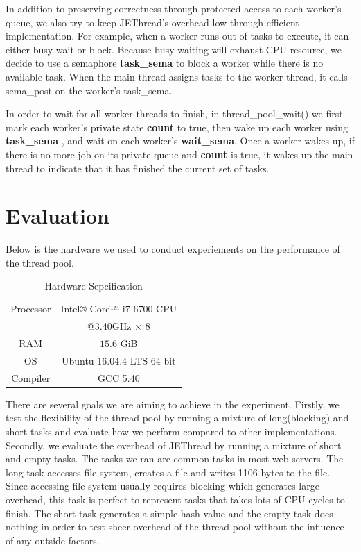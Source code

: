 \documentclass[journal, a4paper]{IEEEtran}
\begin{document}
In addition to preserving correctness through protected access to each worker's queue, we also try to keep JEThread's overhead low through efficient implementation. For example, when a worker runs out of tasks to execute, it can either busy wait or block. Because busy waiting will exhaust CPU resource, we decide to use a semaphore \textbf{task\_sema} to block a worker while there is no available task. When the main thread assigns tasks to the worker thread, it calls sema\_post on the worker's task\_sema. 

In order to wait for all worker threads to finish, in thread\_pool\_wait() we first mark each worker's private state \textbf{count} to true, then wake up each worker using \textbf{task\_sema} , and wait on each worker's \textbf{wait\_sema}. Once a worker wakes up, if there is no more job on its private queue and \textbf{count} is true, it wakes up the main thread to indicate that it has finished the current set of tasks. 

\section{Evaluation}
Below is the hardware we used to conduct experiements on the performance of the thread pool.
	\begin{table}[!hbt]
	\begin{center}
		\caption{Hardware Sepcification}
		\label{tab:simParameters}
		\begin{tabular}{|c|c|}
			\hline
			Processor & Intel® Core™ i7-6700 CPU \\
								&@3.40GHz $\times$ 8\\
			\hline
			RAM & $15.6$ GiB \\
			\hline
			OS & Ubuntu 16.04.4 LTS 64-bit\\
			\hline
			Compiler & GCC 5.40\\
			\hline
		\end{tabular}
		\end{center}
	\end{table}
	
There are several goals we are aiming to achieve in the experiment. Firstly, we test the flexibility of the thread pool by running a mixture of long(blocking) and short tasks and evaluate how we perform compared to other implementations. Secondly, we evaluate the overhead of JEThread by running a mixture of short and empty tasks. The tasks we ran are common tasks in most web servers. The long task accesses file system, creates a file and writes 1106 bytes to the file. Since accessing file system usually requires blocking which generates large overhead, this task is perfect to represent tasks that takes lots of CPU cycles to finish. The short task generates a simple hash value and the empty task does nothing in order to test sheer overhead of the thread pool without the influence of any outside factors. 
\end{document}
